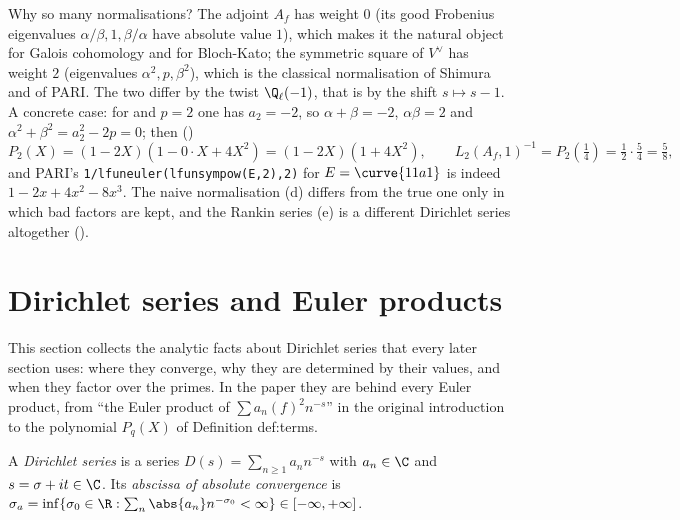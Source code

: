 Why so many normalisations? The adjoint $A_f$ has weight $0$ (its good Frobenius eigenvalues $\alpha/\beta,1,\beta/\alpha$ have absolute value $1$), which makes it the natural
object for Galois cohomology and for Bloch-Kato; the symmetric square of $V^\vee$ has weight $2$ (eigenvalues $\alpha^2,p,\beta^2$), which is the classical normalisation of
Shimura and of PARI. The two differ by the twist $\Q_\ell(-1)$, that is by the shift $s\mapsto s-1$. A concrete case: for  and $p=2$ one has $a_2=-2$, so
$\alpha+\beta=-2$, $\alpha\beta=2$ and $\alpha^2+\beta^2=a_2^2-2p=0$; then ()
\[
P_2(X)=(1-2X)(1-0\cdot X+4X^2)=(1-2X)(1+4X^2),\qquad L_2(A_f,1)^{-1}=P_2(\tfrac14)=\tfrac12\cdot\tfrac54=\tfrac58,
\]
and PARI's \texttt{1/lfuneuler(lfunsympow(E,2),2)} for $E=\curve{11a1}$ is indeed $1-2x+4x^2-8x^3$. The naive normalisation (d) differs from the true one only in which bad
factors are kept, and the Rankin series (e) is a different Dirichlet series altogether ().

\section{Dirichlet series and Euler products}\label{sec:lfunctions:dirichlet}

This section collects the analytic facts about Dirichlet series that every later section uses: where they converge, why they are determined by their
values, and when they factor over the primes. In the paper they are behind every Euler product, from ``the Euler product of $\sum a_n(f)^2n^{-s}$'' in the
original introduction to the polynomial $P_q(X)$ of Definition def:terms.

\begin{definition}\label{def:lfunctions:dirichlet-series}
A \emph{Dirichlet series} is a series $D(s)=\sum_{n\ge1}a_nn^{-s}$ with $a_n\in\C$ and $s=\sigma+it\in\C$. Its \emph{abscissa of absolute convergence} is
$\sigma_a=\inf\{\sigma_0\in\R:\sum_n\abs{a_n}n^{-\sigma_0}<\infty\}\in[-\infty,+\infty]$.
\end{definition}

